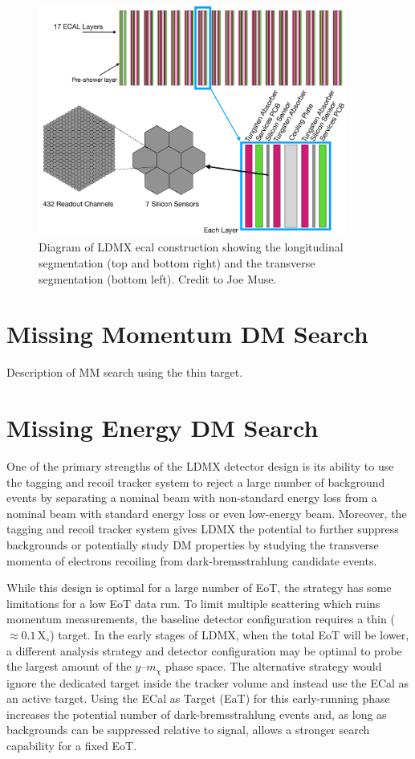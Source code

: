 \begin{figure}
  \centering
  \includegraphics[width=0.9\textwidth]{figures/ldmx/experiment/ecal.pdf}
  \caption{
    Diagram of LDMX \ac{ecal} construction showing the longitudinal segmentation
    (top and bottom right) and the transverse segmentation (bottom left).
    Credit to Joe Muse.
  }
  \label{fig:ldmx-ecal}
\end{figure}

\section{Missing Momentum DM Search}
\begin{todoenv}
Description of MM search using the thin target.
\end{todoenv}

\section{Missing Energy DM Search}
One of the primary strengths of the LDMX detector design is its ability to use the tagging
and recoil tracker system to reject a large number of background events by separating a nominal
beam with non-standard energy loss from a nominal beam with standard energy loss or even low-energy
beam. Moreover, the tagging and recoil tracker system gives LDMX the potential to further suppress
backgrounds or potentially study DM properties by studying the transverse momenta of electrons
recoiling from dark-bremsstrahlung candidate events.

While this design is optimal for a large number of EoT, the strategy has some limitations for a low
EoT data run. To limit multiple scattering which ruins momentum measurements, the baseline detector
configuration requires a thin ($\approx 0.1 \,\mathrm{X}_\circ$) target. In the early stages of
LDMX, when the total EoT will be lower, a different analysis strategy and detector configuration
may be optimal to probe the largest amount of the $y$--$m_\chi$ phase space. The alternative
strategy would ignore the dedicated target inside the tracker volume and instead use the ECal as an
active target. Using the ECal as Target (EaT) for this early-running phase increases the potential
number of dark-bremsstrahlung events and, as long as backgrounds can be suppressed relative to
signal, allows a stronger search capability for a fixed EoT.

